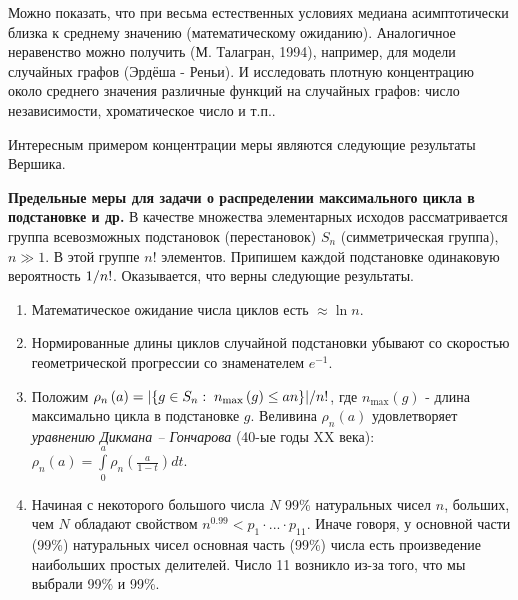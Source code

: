 Можно показать, что при весьма естественных условиях медиана асимптотически 
близка к среднему значению (математическому ожиданию). Аналогичное 
неравенство можно получить (М. Талагран, 1994), например, для модели 
случайных графов (Эрдёша - Реньи). И исследовать плотную концентрацию около 
среднего значения различные функций на случайных графов: число 
независимости, хроматическое число и т.п..

\medskip
\medskip

Интересным примером концентрации меры являются следующие результаты Вершика. 

\textbf{Предельные меры для задачи о распределении максимального цикла в подстановке и др.}
В качестве множества элементарных исходов рассматривается группа всевозможных 
подстановок (перестановок) $S_n $ (симметрическая группа), $n\gg 1$. В этой 
группе $n!$ элементов. Припишем каждой подстановке одинаковую вероятность $1 
\mathord{\left/ {\vphantom {1 {n!}}} \right. \kern-\nulldelimiterspace} 
{n!}$. Оказывается, что верны следующие результаты.
\begin{enumerate}
\item  Математическое ожидание числа циклов есть 
$\approx \ln n$.

\item  Нормированные длины циклов случайной 
подстановки убывают со скоростью геометрической прогрессии со знаменателем 
$e^{-1}$.

\item Положим $\rho _n \left( a \right)={\left| {\left\{ {g\in S_n 
:\;n_{\max } \left( g \right)\le an} \right\}} \right|} \mathord{\left/ 
{\vphantom {{\left| {\left\{ {g\in S_n :\;n_{\max } \left( g \right)\le an} 
\right\}} \right|} {n!}}} \right. \kern-\nulldelimiterspace} {n!}$, где 
$n_{\max } \left( g \right)$ - длина максимально цикла в подстановке $g$. 
Веливина $\rho _n \left( a \right)$ удовлетворяет \textit{уравнению Дикмана -- Гончарова} (40-ые годы XX 
века):
$
\rho _n \left( a \right)=\int\limits_0^a {\rho _n \left( {\frac{a}{1-t}} 
\right)dt} .
$
\item  Начиная с некоторого большого числа $N$ 99{\%} 
натуральных чисел $n$, больших, чем $N$ обладают свойством
$
n^{0.99}<p_1 \cdot ...\cdot p_{11} .
$
Иначе говоря, у основной части (99{\%}) натуральных чисел основная часть 
(99{\%}) числа есть произведение наибольших простых делителей. Число 11 
возникло из-за того, что мы выбрали 99{\%} и 99{\%}.
\end{enumerate}


